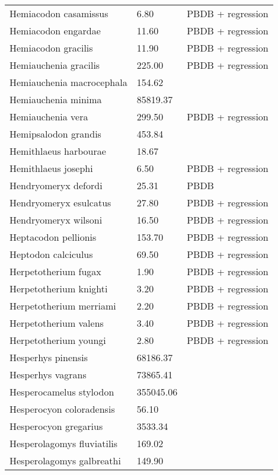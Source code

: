 \begin{longtable}{p{} p{} p{}}
    Hemiacodon casamissus & 6.80 & PBDB + regression \\ 
    Hemiacodon engardae & 11.60 & PBDB + regression \\ 
    Hemiacodon gracilis & 11.90 & PBDB + regression \\ 
    Hemiauchenia gracilis & 225.00 & PBDB + regression \\ 
    Hemiauchenia macrocephala & 154.62 & \cite{Smith2004} \\ 
    Hemiauchenia minima & 85819.37 & \cite{Tomiya2013} \\ 
    Hemiauchenia vera & 299.50 & PBDB + regression \\ 
    Hemipsalodon grandis & 453.84 & \cite{Scott1937} \\ 
    Hemithlaeus harbourae & 18.67 & \cite{Loomis1932} \\ 
    Hemithlaeus josephi & 6.50 & PBDB + regression \\ 
    Hendryomeryx defordi & 25.31 & PBDB \\ 
    Hendryomeryx esulcatus & 27.80 & PBDB + regression \\ 
    Hendryomeryx wilsoni & 16.50 & PBDB + regression \\ 
    Heptacodon pellionis & 153.70 & PBDB + regression \\ 
    Heptodon calciculus & 69.50 & PBDB + regression \\ 
    Herpetotherium fugax & 1.90 & PBDB + regression \\ 
    Herpetotherium knighti & 3.20 & PBDB + regression \\ 
    Herpetotherium merriami & 2.20 & PBDB + regression \\ 
    Herpetotherium valens & 3.40 & PBDB + regression \\ 
    Herpetotherium youngi & 2.80 & PBDB + regression \\ 
    Hesperhys pinensis & 68186.37 & \cite{Tomiya2013} \\ 
    Hesperhys vagrans & 73865.41 & \cite{Tomiya2013} \\ 
    Hesperocamelus stylodon & 355045.06 & \cite{Tomiya2013} \\ 
    Hesperocyon coloradensis & 56.10 & \cite{Loomis1932} \\ 
    Hesperocyon gregarius & 3533.34 & \cite{Tomiya2013} \\ 
    Hesperolagomys fluviatilis & 169.02 & \cite{Tomiya2013} \\ 
    Hesperolagomys galbreathi & 149.90 & \cite{Tomiya2013} \\ 

\end{longtable}
